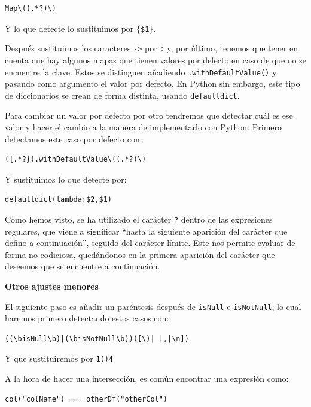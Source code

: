 \documentclass[12pt,twoside,titlepage]{report}
\newcommand{\quotes}[1]{``#1''}
\begin{document}
\begin{lstlisting}
Map\((.*?)\)
\end{lstlisting}

Y lo que detecte lo sustituimos por \texttt{$\lbrace$\$1$\rbrace$}.

Después sustituimos los caracteres \texttt{->} por \texttt{:} y, por último, tenemos que tener en cuenta que hay algunos mapas que tienen valores por defecto en caso de que no se encuentre la clave. Estos se distinguen añadiendo \texttt{.withDefaultValue()} y pasando como argumento el valor por defecto. En Python sin embargo, este tipo de diccionarios se crean de forma distinta, usando \texttt{defaultdict}.

Para cambiar un valor por defecto por otro tendremos que detectar cuál es ese valor y hacer el cambio a la manera de implementarlo con Python. Primero detectamos este caso por defecto con:

\begin{lstlisting}
({.*?}).withDefaultValue\((.*?)\)
\end{lstlisting}

Y sustituimos lo que detecte por:

\begin{lstlisting}
defaultdict(lambda:$2,$1)
\end{lstlisting}

Como hemos visto, se ha utilizado el carácter \texttt{?} dentro de las expresiones regulares, que viene a significar \quotes{hasta la siguiente aparición del carácter que defino a continuación}, seguido del carácter límite. Este nos permite evaluar de forma no codiciosa, quedándonos en la primera aparición del carácter que deseemos que se encuentre a continuación.


\textbf{Otros ajustes menores}

El siguiente paso es añadir un paréntesis después de \texttt{isNull} e \texttt{isNotNull}, lo cual haremos primero detectando estos casos con:

\begin{lstlisting}
((\bisNull\b)|(\bisNotNull\b))([\)| |,|\n])
\end{lstlisting}

Y que sustituiremos por \texttt{1()4}

A la hora de hacer una intersección, es común encontrar una expresión como:

\begin{lstlisting}
col("colName") === otherDf("otherCol")
\end{lstlisting}
\end{document}
